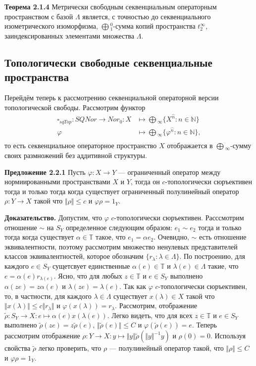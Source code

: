 \documentclass[12pt]{article}
\begin{document}
{\bf Теорема 2.1.4} Метрически свободным секвенциальным операторным
пространством с базой $\Lambda$ является, с точностью до секвенциального
изометрического изоморфизма, $\bigoplus{}_1^0$-сумма копий пространства
$t_2^{\infty}$, заиндексированных элементами множества $\Lambda$. 

\subsection{Топологически свободные секвенциальные пространства}

Перейдём теперь к рассмотрению секвенциальной операторной версии  топологической
свободы. Рассмотрим функтор 
$$
\begin{aligned}
\square_{sqTop} 
: SQNor \to Nor_0
: X &\mapsto \bigoplus{}_\infty  \{X^{\wideparen{n}} : n \in \mathbb{N} \} \\
\varphi&\mapsto\bigoplus{}_\infty \{\varphi^{\wideparen{n}}:n\in\mathbb{N} \},\\
\end{aligned}
$$ 
то есть секвенциальное операторное пространство $X$ отображается в
$\bigoplus{}_\infty$-сумму своих размножений без аддитивной структуры.

{\bf Предложение 2.2.1}\label{PrCTopSurIsRetrInNor0} Пусть 
$\varphi:X\to Y$ --- ограниченный оператор между
нормиированными пространствами $X$ и $Y$, тогда он $c$-топологически сюръективен
тогда и только тогда когда существует ограниченный полулинейный оператор
$\rho:Y\to X$ такой что $\Vert\rho\Vert\leq c$ и $\varphi\rho=1_Y$.

{\bf Доказательство.} Допустим, что $\varphi$ $c$-топологически сюръективен.
Расссмотрим отношение $\sim$ на $S_Y$ определенное следующим образом: $e_1\sim
e_2$ тогда и только тогда когда существует $\alpha\in\mathbb{T}$ такое, что
$e_1=\alpha e_2$. Очевидно, $\sim$ есть отношение эквивалентности, поэтому
рассмотрим множество ненулевых представителей классов эквивалентностей, которое
обозначим $ \{r_\lambda:\lambda\in\Lambda \}$. По построению, для каждого $e\in
S_Y$ сущетсвует единственные $\alpha(e)\in\mathbb{T}$ и $\lambda(e)\in\Lambda$
такие, что $e=\alpha(e)r_{\lambda(e)}$. Ясно, что для любых $z\in\mathbb{T}$ и
$e\in S_Y$ выполнено $\alpha(ze)=z\alpha(e)$ и $\lambda(ze)=\lambda(e)$. Так как
$\varphi$ $c$-топологически сюръективен, то, в частности, для каждого
$\lambda\in\Lambda$ существует $x(\lambda)\in X$ такой что $\Vert
x(\lambda)\Vert\leq c\Vert r_\lambda\Vert$ и $\varphi(x(\lambda))=r_\lambda$.
Рассмотрим, отображение $\tilde{\rho}:S_Y\to X:e\mapsto \alpha(e)x(\lambda(e))$.
Легко видеть, что для всех $z\in\mathbb{T}$ и $e\in S_Y$ выполнено
$\tilde{\rho}(z e)=z\tilde{\rho}(e)$, $\Vert\tilde{\rho}(e)\Vert\leq C$ и
$\varphi(\tilde{\rho}(e))=e$. Теперь рассмотрим отображение $\rho:Y\to X:
y\mapsto \Vert y\Vert\tilde{\rho}(\Vert y\Vert^{-1} y)$ и $\rho(0)=0$. Используя
свойства $\tilde{\rho}$ легко проверить, что $\rho$ --- полулинейный оператор
такой, что $\Vert\rho\Vert\leq C$ и $\varphi\rho=1_Y$.
\end{document}
